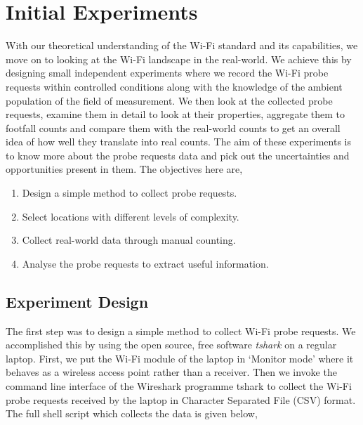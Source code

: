 \section{Initial Experiments}\label{section:intial:experiments}

With our theoretical understanding of the Wi-Fi standard and its capabilities, we move on to looking at the Wi-Fi landscape in the real-world.
We achieve this by designing small independent experiments where we record the Wi-Fi probe requests within controlled conditions along with the knowledge of the ambient population of the field of measurement. 
We then look at the collected probe requests, examine them in detail to look at their properties, aggregate them to footfall counts and compare them with the real-world counts to get an overall idea of how well they translate into real counts.
The aim of these experiments is to know more about the probe requests data and pick out the uncertainties and opportunities present in them.
The objectives here are,

\begin{enumerate}[leftmargin = 2em, rightmargin=2em]
  \itemsep-0.25em
  \item Design a simple method to collect probe requests.
  \item Select locations with different levels of complexity.
  \item Collect real-world data through manual counting.
  \item Analyse the probe requests to extract useful information.
\end{enumerate}

\subsection{Experiment Design}

The first step was to design a simple method to collect Wi-Fi probe requests.
We accomplished this by using the open source, free software \textit{tshark} \cite{wireshark2} on a regular laptop.
First, we put the Wi-Fi module of the laptop in `Monitor mode' where it behaves as a wireless access point rather than a receiver.
Then we invoke the command line interface of the Wireshark programme tshark to collect the Wi-Fi probe requests received by the laptop in Character Separated File (CSV) format. 
The full shell script which collects the data is given below,

